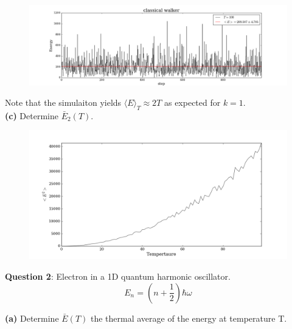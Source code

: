 \documentclass{article}
\begin{document}
\begin{figure}[H]
\begin{center}
\includegraphics[width=16cm]{../output/classical/walkers.png} 
\end{center}
\end{figure}

Note that the simulaiton yields $\langle E\rangle_{T} \approx 2T$ as expected for $k=1$. \\

\textbf{(c)} Determine $\bar{E}_{2}(T)$. 

\begin{figure}[H]
\begin{center}
\includegraphics[width=16cm]{../output/classical/expected_sq.png} 
\end{center}
\end{figure}


\bigskip
\textbf{Question 2}: Electron in a 1D quantum harmonic oscillator. 
	\[E_{n} = \left(n + \frac{1}{2} \right)\hbar\omega \]

\textbf{(a)} Determine $\bar{E}(T)$ the thermal average of the energy at temperature T. \\
\end{document}
